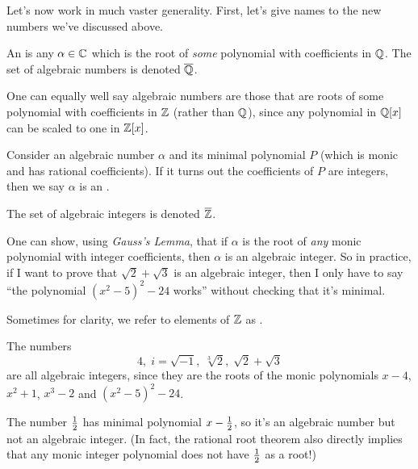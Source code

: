 Let's now work in much vaster generality.
First, let's give names to the new numbers we've discussed above.
\begin{definition}
	An  is any $\alpha \in \mathbb C$
	which is the root of \emph{some} polynomial with coefficients in $\mathbb Q$.
	The set of algebraic numbers is denoted $\overline{\mathbb Q}$.
\end{definition}
\begin{remark}
	One can equally well say algebraic numbers are those that
	are roots of some polynomial with coefficients in $\mathbb Z$ (rather than $\mathbb Q$),
	since any polynomial in $\mathbb Q[x]$ can be scaled to one in $\mathbb Z[x]$.
\end{remark}
\begin{definition}
	Consider an algebraic number $\alpha$ and
	its minimal polynomial $P$
	(which is monic and has rational coefficients).
	If it turns out the coefficients of $P$ are integers,
	then we say $\alpha$ is an .

	The set of algebraic integers is denoted $\overline{\mathbb Z}$.
\end{definition}
\begin{remark}
	One can show, using \emph{Gauss's Lemma}, that if $\alpha$ is the root
	of \emph{any} monic polynomial with integer coefficients,
	then $\alpha$ is an algebraic integer.
	So in practice, if I want to prove that $\sqrt 2 + \sqrt 3$ is an algebraic integer,
	then I only have to say ``the polynomial $(x^2-5)^2-24$ works''
	without checking that it's minimal.
\end{remark}
Sometimes for clarity, we refer to elements of $\mathbb Z$
as .
\begin{example}
	The numbers
	\[ 4, \; i = \sqrt{-1}, \; \sqrt[3]{2}, \; \sqrt2+\sqrt3 \]
	are all algebraic integers, since they are the roots of the monic polynomials
	$x-4$, $x^2+1$, $x^3-2$ and $(x^2-5)^2-24$.

	The number $\frac{1}{2}$ has minimal polynomial $x - \frac{1}{2}$,
	so it's an algebraic number but not an algebraic integer.
	(In fact, the rational root theorem also directly implies
	that any monic integer polynomial does not have $\frac{1}{2}$ as a root!)
\end{example}


